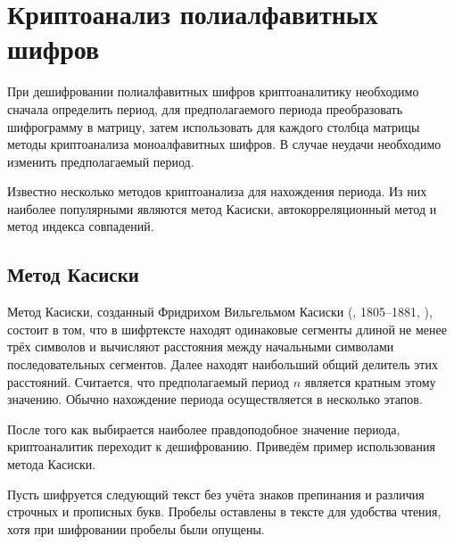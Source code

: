 \section[Криптоанализ полиалфавитных шифров]{Криптоанализ полиалфавитных \protect\\ шифров}

При дешифровании полиалфавитных шифров криптоаналитику необходимо сначала определить период, для предполагаемого периода преобразовать шифрограмму в матрицу, затем использовать для каждого столбца матрицы методы криптоанализа моноалфавитных шифров. В случае неудачи необходимо изменить предполагаемый период.

Известно несколько методов криптоанализа для нахождения периода. Из них наиболее популярными являются метод Касиски, автокорреляционный метод и метод индекса совпадений.


\subsection{Метод Касиски}

Метод Касиски, созданный Фридрихом Вильгельмом Касиски (, 1805--1881, \cite{Kasiski:1863}), состоит в том, что в шифртексте находят одинаковые сегменты длиной не менее трёх символов и вычисляют расстояния между начальными символами последовательных сегментов. Далее находят наибольший общий делитель этих расстояний. Считается, что предполагаемый период $n$ является кратным этому значению. Обычно нахождение периода осуществляется в несколько этапов.

После того как выбирается наиболее правдоподобное значение периода, криптоаналитик переходит к дешифрованию. Приведём пример использования метода Касиски.

\example
Пусть шифруется следующий текст без учёта знаков препинания и различия строчных и прописных букв. Пробелы оставлены в тексте для удобства чтения, хотя при шифровании пробелы были опущены.

